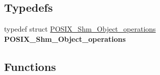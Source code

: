 \subsection*{Typedefs}
\begin{DoxyCompactItemize}
\item 
\mbox{\label{group__POSIXShmPrivate_gacf18fb12b0569545affb2eace8113b84}} 
typedef struct \mbox{\hyperlink{structPOSIX__Shm__Object__operations}{P\+O\+S\+I\+X\+\_\+\+Shm\+\_\+\+Object\+\_\+operations}} {\bfseries P\+O\+S\+I\+X\+\_\+\+Shm\+\_\+\+Object\+\_\+operations}
\end{DoxyCompactItemize}
\subsection*{Functions}
